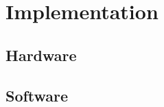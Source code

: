 \chapter{Implementation}
\label{chap:implementation}

\section{Hardware}
\label{sec:hardware}

\section{Software}
\label{sec:software}
